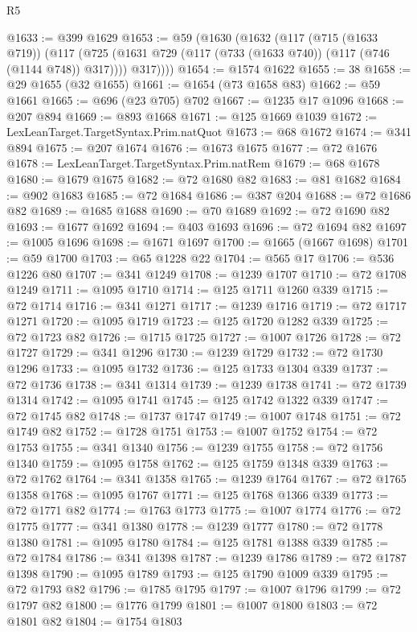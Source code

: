 \begin{lexlean}{R5}
\begin{coremodule}
@1633 := @399 @1629
@1653 := @59
    (@1630
      (@1632
        (@117
          (@715 (@1633 @719))
          (@117
            (@725 (@1631 @729 (@117 (@733 (@1633 @740)) (@117 (@746 (@1144 @748)) @317))))
            @317))))
@1654 := @1574 @1622
@1655 := 38
@1658 := @29 @1655 (@32 @1655)
@1661 := @1654 (@73 @1658 @83)
@1662 := @59 @1661
@1665 := @696 (@23 @705) @702
@1667 := @1235 @17 @1096
@1668 := @207 @894
@1669 := @893 @1668
@1671 := @125 @1669 @1039
@1672 := LexLeanTarget.TargetSyntax.Prim.natQuot
@1673 := @68 @1672
@1674 := @341 @894
@1675 := @207 @1674
@1676 := @1673 @1675
@1677 := @72 @1676
@1678 := LexLeanTarget.TargetSyntax.Prim.natRem
@1679 := @68 @1678
@1680 := @1679 @1675
@1682 := @72 @1680 @82
@1683 := @81 @1682
@1684 := @902 @1683
@1685 := @72 @1684
@1686 := @387 @204
@1688 := @72 @1686 @82
@1689 := @1685 @1688
@1690 := @70 @1689
@1692 := @72 @1690 @82
@1693 := @1677 @1692
@1694 := @403 @1693
@1696 := @72 @1694 @82
@1697 := @1005 @1696
@1698 := @1671 @1697
@1700 := @1665 (@1667 @1698)
@1701 := @59 @1700
@1703 := @65 @1228 @22
@1704 := @565 @17
@1706 := @536 @1226 @80
@1707 := @341 @1249
@1708 := @1239 @1707
@1710 := @72 @1708 @1249
@1711 := @1095 @1710
@1714 := @125 @1711 @1260 @339
@1715 := @72 @1714
@1716 := @341 @1271
@1717 := @1239 @1716
@1719 := @72 @1717 @1271
@1720 := @1095 @1719
@1723 := @125 @1720 @1282 @339
@1725 := @72 @1723 @82
@1726 := @1715 @1725
@1727 := @1007 @1726
@1728 := @72 @1727
@1729 := @341 @1296
@1730 := @1239 @1729
@1732 := @72 @1730 @1296
@1733 := @1095 @1732
@1736 := @125 @1733 @1304 @339
@1737 := @72 @1736
@1738 := @341 @1314
@1739 := @1239 @1738
@1741 := @72 @1739 @1314
@1742 := @1095 @1741
@1745 := @125 @1742 @1322 @339
@1747 := @72 @1745 @82
@1748 := @1737 @1747
@1749 := @1007 @1748
@1751 := @72 @1749 @82
@1752 := @1728 @1751
@1753 := @1007 @1752
@1754 := @72 @1753
@1755 := @341 @1340
@1756 := @1239 @1755
@1758 := @72 @1756 @1340
@1759 := @1095 @1758
@1762 := @125 @1759 @1348 @339
@1763 := @72 @1762
@1764 := @341 @1358
@1765 := @1239 @1764
@1767 := @72 @1765 @1358
@1768 := @1095 @1767
@1771 := @125 @1768 @1366 @339
@1773 := @72 @1771 @82
@1774 := @1763 @1773
@1775 := @1007 @1774
@1776 := @72 @1775
@1777 := @341 @1380
@1778 := @1239 @1777
@1780 := @72 @1778 @1380
@1781 := @1095 @1780
@1784 := @125 @1781 @1388 @339
@1785 := @72 @1784
@1786 := @341 @1398
@1787 := @1239 @1786
@1789 := @72 @1787 @1398
@1790 := @1095 @1789
@1793 := @125 @1790 @1009 @339
@1795 := @72 @1793 @82
@1796 := @1785 @1795
@1797 := @1007 @1796
@1799 := @72 @1797 @82
@1800 := @1776 @1799
@1801 := @1007 @1800
@1803 := @72 @1801 @82
@1804 := @1754 @1803

\end{coremodule}
\end{lexlean}
